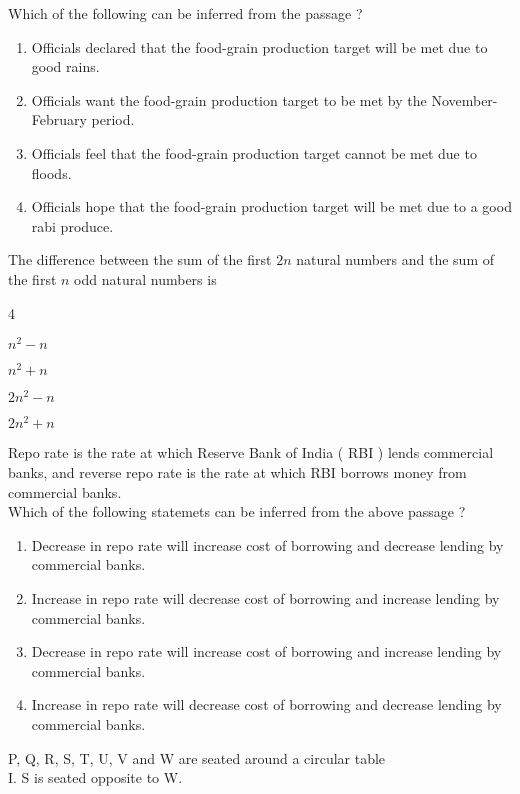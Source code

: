 		Which of the following can be inferred from the passage ?
		\begin{enumerate}
			\item Officials declared that the food-grain production target will be met due to good rains.
			\item Officials want the food-grain production target to be met by the November-February period.
			\item Officials feel that the food-grain production target cannot be met due to floods.
			\item Officials hope that the food-grain production target will be met due to a good rabi produce.
		\end{enumerate}
	\item The difference between the sum of the first $2n$ natural numbers and the sum of the first $n$ odd natural numbers is
		\begin{enumerate}
		\end{enumerate}
	\item Repo rate is the rate at which Reserve Bank of India ( RBI ) lends commercial banks, and reverse repo rate is the rate at which RBI borrows money from commercial banks. \\
		Which of the following statemets can be inferred from the above passage ?
		\begin{enumerate}
			\item Decrease in repo rate will increase cost of borrowing and decrease lending by commercial banks.
			\item Increase in repo rate will decrease cost of borrowing and increase lending by commercial banks.
			\item Decrease in repo rate will increase cost of borrowing and increase lending by commercial banks.
			\item Increase in repo rate will decrease cost of borrowing and decrease lending by commercial banks.
		\end{enumerate}
	\item P, Q, R, S, T, U, V and W are seated around a circular table \\
		I. S is seated opposite to W. \\
